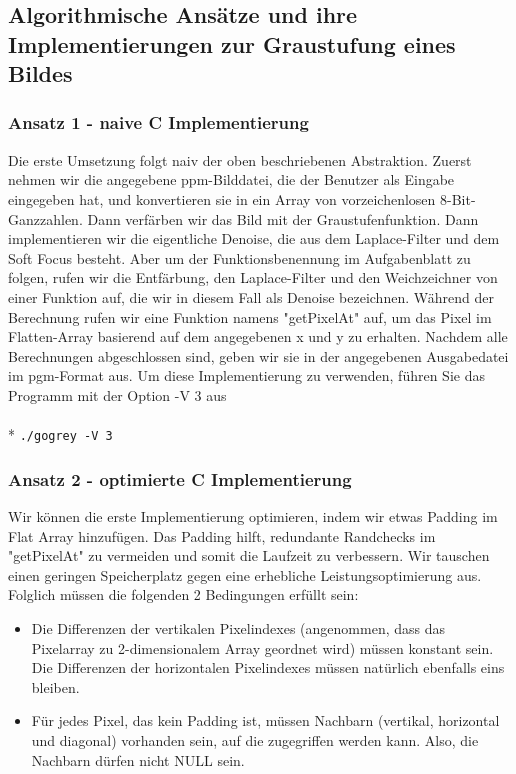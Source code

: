 \documentclass[course=asp]{aspdoc}
\begin{document}
\subsection{Algorithmische Ansätze und ihre Implementierungen zur Graustufung eines Bildes }
\subsubsection{Ansatz 1 - naive C Implementierung}
Die erste Umsetzung folgt naiv der oben beschriebenen Abstraktion. Zuerst nehmen wir die angegebene ppm-Bilddatei, die der Benutzer als Eingabe eingegeben hat, und konvertieren sie in ein Array von vorzeichenlosen 8-Bit-Ganzzahlen. Dann verfärben wir das Bild mit der Graustufenfunktion. Dann implementieren wir die eigentliche Denoise, die aus dem Laplace-Filter und dem Soft Focus besteht. Aber um der Funktionsbenennung im Aufgabenblatt zu folgen, rufen wir die Entfärbung, den Laplace-Filter und den Weichzeichner von einer Funktion auf, die wir in diesem Fall als Denoise bezeichnen. Während der Berechnung rufen wir eine Funktion namens "getPixelAt" auf, um das Pixel im Flatten-Array basierend auf dem angegebenen x und y zu erhalten.
Nachdem alle Berechnungen abgeschlossen sind, geben wir sie in der angegebenen Ausgabedatei im pgm-Format aus. Um diese Implementierung zu verwenden, führen Sie das Programm mit der Option -V 3 aus
\\
\\*
\texttt{./gogrey -V 3}

\subsubsection{Ansatz 2 - optimierte C Implementierung}
Wir können die erste Implementierung optimieren, indem wir etwas Padding im Flat Array hinzufügen. Das Padding hilft, redundante Randchecks im "getPixelAt" zu vermeiden und somit die Laufzeit zu verbessern. Wir tauschen einen geringen Speicherplatz gegen eine erhebliche Leistungsoptimierung aus. Folglich müssen die folgenden 2 Bedingungen erfüllt sein:
\begin{itemize}
    \item Die Differenzen der vertikalen Pixelindexes (angenommen, dass das Pixelarray zu 2-dimensionalem Array geordnet wird) müssen konstant sein. Die Differenzen der horizontalen Pixelindexes müssen natürlich ebenfalls eins bleiben.
    \item Für jedes Pixel, das kein Padding ist, müssen Nachbarn (vertikal, horizontal und diagonal) vorhanden sein, auf die zugegriffen werden kann. Also, die Nachbarn dürfen nicht NULL sein.
\end{itemize}
\end{document}
